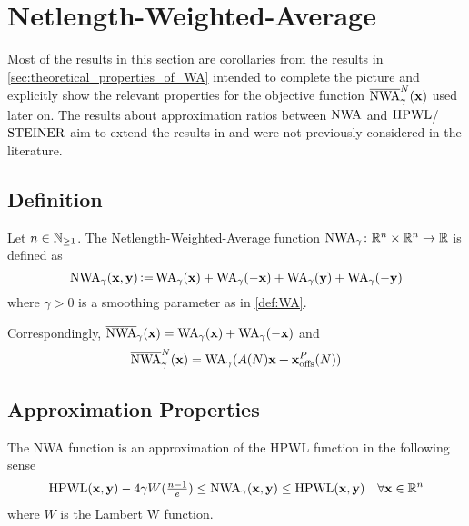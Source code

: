 \section{Netlength-Weighted-Average} \label{sec:theoretical_properties_of_NWA}

Most of the results in this section are corollaries from the results in \cref{sec:theoretical_properties_of_WA}
intended to complete the picture and
explicitly show the relevant properties for the objective function \(\overline{\operatorname{NWA}}_{\gamma}^N(\mathbf{x})\) used later on.
The results about approximation ratios between \(\operatorname{NWA}\) and \(\operatorname{HPWL}\)/\(\operatorname{STEINER}\)
aim to extend the results in \cite{BrennerVygen-WorstCaseRatiosOfNetworksInTheRectilinearPlane}
and were not previously considered in the literature.

\subsection{Definition} \label{sec:NWA_definition}

\begin{definition} \label{def:NWA}
 Let \(n \in \mathbb{N}_{\geq 1}\). The Netlength-Weighted-Average function \(\operatorname{NWA}_\gamma \colon \mathbb{R}^n \times \mathbb{R}^n \to \mathbb{R}\) is defined as
 \[ \operatorname{NWA}_{\gamma}(\mathbf{x}, \mathbf{y}) \operatorname{\vcentcolon=} \operatorname{WA}_{\gamma}(\mathbf{x}) + \operatorname{WA}_{\gamma}(-\mathbf{x}) + \operatorname{WA}_{\gamma}(\mathbf{y}) + \operatorname{WA}_{\gamma}(-\mathbf{y}) \]
 where \(\gamma > 0\) is a smoothing parameter as in \cref{def:WA}.
\end{definition}


\begin{remark}
 Correspondingly, \(\overline{\operatorname{NWA}}_{\gamma}(\mathbf{x}) = \operatorname{WA}_{\gamma}(\mathbf{x}) + \operatorname{WA}_{\gamma}(-\mathbf{x})\) and
 \[ \overline{\operatorname{NWA}}_{\gamma}^N(\mathbf{x}) = \operatorname{WA}_{\gamma}(A(N) \mathbf{x} + \mathbf{x}_{\operatorname{offs}}^P(N)) \]
\end{remark}



\subsection{Approximation Properties} \label{sec:NWA_approximation_properties}

\begin{corollary} \label{thm:NWA_approximates_HPWL}
 The NWA function is an approximation of the HPWL function in the following sense
 \[ \operatorname{HPWL} (\mathbf{x}, \mathbf{y}) - 4 \gamma W (\tfrac{n-1}{e}) \leq \operatorname{NWA}_{\gamma}(\mathbf{x}, \mathbf{y}) \leq \operatorname{HPWL} (\mathbf{x}, \mathbf{y}) \quad \forall \mathbf{x} \in \mathbb{R}^n \]
 where \(W\) is the Lambert W function.
\end{corollary}


